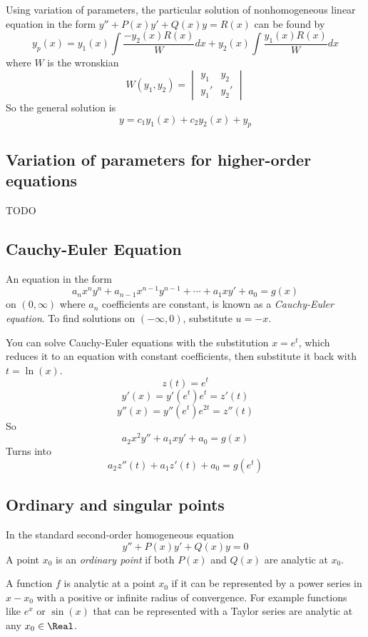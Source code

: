 Using variation of parameters, the particular solution of nonhomogeneous linear equation in the form $y'' + P(x)y' + Q(x)y = R(x)$ can be found by
\[
    y_p(x) = y_1(x) \int \frac{-y_2(x) R(x)}{W}dx + y_2(x) \int \frac{y_1(x) R(x)}{W}dx
\]
where $W$ is the wronskian
\[
    W(y_1, y_2) = \begin{vmatrix}
        y_1 & y_2 \\
        y_1' & y_2'
    \end{vmatrix}
\]
So the general solution is
\[
    y = c_1 y_1(x) + c_2 y_2(x) + y_p
\]

\subsection{Variation of parameters for higher-order equations}

TODO

\subsection{Cauchy-Euler Equation}

\begin{definition}
    An equation in the form
    \[
        a_n x^n y^n + a_{n - 1} x^{n - 1} y^{n - 1} + \cdots + a_1 x y' + a_0 = g(x)
    \]
    on $(0, \infty)$ where $a_n$ coefficients are constant, is known as a \textit{Cauchy-Euler equation}. To find solutions on $(-\infty, 0)$, substitute $u = -x$.
\end{definition}

You can solve Cauchy-Euler equations with the substitution $x = e^t$, which reduces it to an equation with constant coefficients, then substitute it back with $t = \ln(x)$.
\[
    z(t) = e^t
\]
\[
    y'(x) = y'(e^t) e^t = z'(t)
\]
\[
    y''(x) = y''(e^t) e^{2t} = z''(t)
\]
So
\[
    a_2 x^2 y'' + a_1 x y' + a_0 = g(x)
\]
Turns into
\[
    a_2 z''(t) + a_1 z'(t) + a_0 = g(e^t)
\]

\subsection{Ordinary and singular points}

In the standard second-order homogeneous equation
\[
    y'' + P(x)y' + Q(x)y = 0
\]
A point $x_0$ is an \textit{ordinary point} if both $P(x)$ and $Q(x)$ are analytic at $x_0$.

A function $f$ is analytic at a point $x_0$ if it can be represented by a power series in $x - x_0$ with a positive or infinite radius of convergence. For example functions like $e^x$ or $\sin(x)$ that can be represented with a Taylor series are analytic at any $x_0 \in \Real$.

